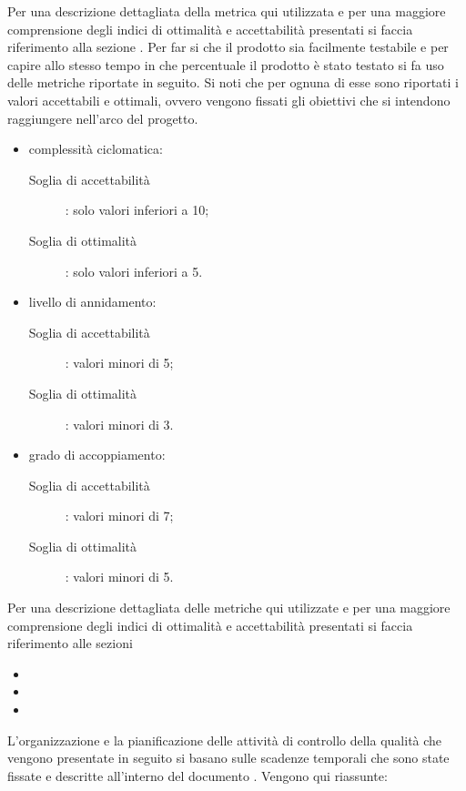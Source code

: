 					Per una descrizione dettagliata della metrica qui utilizzata e per una maggiore comprensione degli indici di ottimalità e accettabilità presentati si faccia riferimento alla sezione .
					Per far si che il prodotto sia facilmente testabile e per capire allo stesso tempo in che percentuale il prodotto è stato testato si fa uso delle metriche riportate in seguito. Si noti che per ognuna di esse sono riportati i valori accettabili e ottimali, ovvero vengono fissati gli obiettivi che si intendono raggiungere nell'arco del progetto.
					\begin{itemize}
						\item complessità ciclomatica:
						\begin{description}
							\item[Soglia di accettabilità]: solo valori inferiori a 10;
							\item[Soglia di ottimalità]: solo valori inferiori a 5.
						\end{description}
						\item livello di annidamento:
						\begin{description}
							\item[Soglia di accettabilità]: valori minori di 5;
							\item[Soglia di ottimalità]: valori minori di 3.
						\end{description}
						\item grado di accoppiamento:
						\begin{description}
							\item[Soglia di accettabilità]: valori minori di 7;
							\item[Soglia di ottimalità]: valori minori di 5.
						\end{description}
					\end{itemize}
					Per una descrizione dettagliata delle metriche qui utilizzate e per una maggiore comprensione degli indici di ottimalità e accettabilità presentati si faccia riferimento alle sezioni
					\begin{itemize}
						\item {}
						\item {}
						\item {}
					\end{itemize}	
		L'organizzazione e la pianificazione delle attività di controllo della qualità che vengono presentate in seguito si basano sulle scadenze temporali che sono state fissate e descritte all'interno del documento . Vengono qui riassunte:
